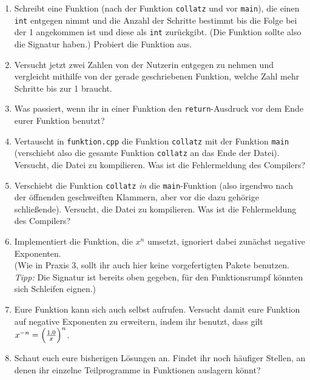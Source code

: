 \begin{spiel}
	\begin{enumerate}
		\item Schreibt eine Funktion (nach der Funktion \texttt{collatz} und vor \texttt{main}), die einen \texttt{int} entgegen nimmt und die Anzahl der Schritte bestimmt bis die Folge bei der 1 angekommen ist und diese als \texttt{int} zurückgibt.
		      (Die Funktion sollte also die Signatur  haben.)
		      Probiert die Funktion aus.
		\item Versucht jetzt zwei Zahlen von der Nutzerin entgegen zu nehmen und vergleicht mithilfe von der gerade geschriebenen Funktion, welche Zahl mehr Schritte bis zur 1 braucht.
		\item Was passiert, wenn ihr in einer Funktion den \texttt{return}-Ausdruck vor dem Ende eurer Funktion benutzt?
		\item Vertauscht in \texttt{funktion.cpp} die Funktion \texttt{collatz} mit der Funktion \texttt{main} (verschiebt also die gesamte Funktion \texttt{collatz} an das Ende der Datei).
		      Versucht, die Datei zu kompilieren.
		      Was ist die Fehlermeldung des Compilers?
		\item Verschiebt die Funktion \texttt{collatz} \emph{in} die \texttt{main}-Funktion (also irgendwo nach der öffnenden geschweiften Klammern, aber vor die dazu gehörige schließende).
		      Versucht, die Datei zu kompilieren. Was ist die Fehlermeldung des Compilers?
		\item Implementiert die Funktion, die $x^n$ umsetzt, ignoriert dabei zunächst negative Exponenten. \\
		      (Wie in Praxis 3, sollt ihr auch hier keine vorgefertigten Pakete benutzen. \emph{Tipp:} Die Signatur ist bereits oben gegeben, für den Funktionsrumpf könnten sich Schleifen eignen.)
		\item Eure Funktion kann sich auch selbst aufrufen. Versucht damit eure Funktion auf negative Exponenten zu erweitern, indem ihr benutzt, dass gilt $x^{-n} = \Bigl(\frac{1.0}{x}\Bigr)^n$.
		\item Schaut euch eure bisherigen Lösungen an.
		      Findet ihr noch häufiger Stellen, an denen ihr einzelne Teilprogramme in Funktionen auslagern könnt?
	\end{enumerate}
\end{spiel}
